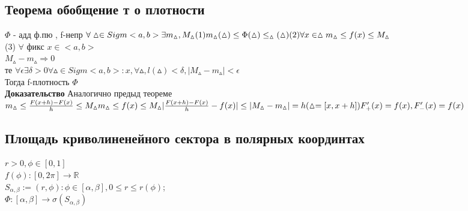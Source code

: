 \documentclass[12pt, a4paper]{article}
\newcommand{\nl}{\newline}
\begin{document}
	\subsection{Теорема обобщение т о плотности} 
	$\Phi$ - адд ф.пю , f-непр
	$ \forall \vartriangle \in Sigm<a,b> \exists m_\vartriangle ,M_\vartriangle \\
	(1)
	m_\vartriangle(\vartriangle) \leq \Phi(\vartriangle)\leq_\vartriangle(\vartriangle)\\
	(2) \forall x \in \vartriangle m_\vartriangle \leq f(x) \leq  M_\vartriangle$\\
	(3) $\forall$ фикс $x \in <a,b>$\\
	$M_\vartriangle-m_\vartriangle \Rightarrow 0$ \\
	те $\forall \epsilon  \exists \delta > 0  \forall \vartriangle \in Sigm<a,b>: x,  \forall \vartriangle, l(\vartriangle) < \delta  ,          |M_\vartriangle - m_\vartriangle|<\epsilon$ \\
	Тогда f-плотность $\Phi$ \\
	\textbf{Доказательство} \nl
	Аналогично предыд теореме \\
	$m_\vartriangle \leq \frac{F(x+h)-F(x)}{h} \leq M_\vartriangle \\
	m_\vartriangle \leq f(x)\leq M_\vartriangle
	|\frac{F(x+h)-F(x)}{h}-f(x)|\leq |M_\vartriangle-m_\vartriangle| = h (\vartriangle =[x,x+h]) \\
	F_+'(x)=f(x) , F_-'(x)=f(x)$ \\
	
	\subsection{Площадь криволиненейного сектора в  полярных координтах}
	$r > 0, \phi \in [0,1]$ \\
	$f(\phi) : [0,2\pi] \rightarrow \mathbb{R}$\\
	$S_{\alpha,\beta}:={(r,\phi) : \phi \in [\alpha,\beta], 0\leq r \leq r(\phi)}$;\\
	$\Phi :[\alpha,\beta]\rightarrow \sigma(S_{\alpha, \beta})$ \\
	
\end{document}
